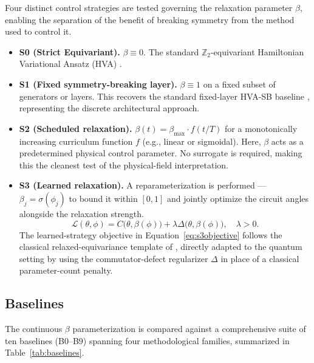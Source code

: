 \documentclass[10pt,twocolumn]{article}
\theoremstyle{remark}
\begin{document}
Four distinct control strategies are tested governing the relaxation parameter $\beta$, enabling the separation of the benefit of breaking symmetry from the method used to control it.
\begin{itemize}
    \item \textbf{S0 (Strict Equivariant).} $\beta \equiv 0$. The standard $\mathbb{Z}_2$-equivariant Hamiltonian Variational Ansatz (HVA) \cite{nguyen2024theory}.
    \item \textbf{S1 (Fixed symmetry-breaking layer).} $\beta \equiv 1$ on a fixed subset of generators or layers. This recovers the standard fixed-layer HVA-SB baseline \cite{park2021symmetry,park2024symmetry}, representing the discrete architectural approach.
    \item \textbf{S2 (Scheduled relaxation).} $\beta(t) = \beta_{\text{max}} \cdot f(t/T)$ for a monotonically increasing curriculum function $f$ (e.g., linear or sigmoidal). Here, $\beta$ acts as a predetermined physical control parameter. No surrogate is required, making this the cleanest test of the physical-field interpretation.
    \item \textbf{S3 (Learned relaxation).} A reparameterization is performed --- $\beta_j = \sigma(\phi_j)$ to bound it within $[0,1]$ and jointly optimize the circuit angles alongside the relaxation strength.
    \begin{equation}
    \mathcal{L}(\theta, \phi) = C\big(\theta, \beta(\phi)\big) + \lambda \Delta\big(\theta, \beta(\phi)\big), \quad \lambda > 0.
    \label{eq:s3objective}
    \end{equation}
    The learned-strategy objective in Equation~\eqref{eq:s3objective} follows the classical relaxed-equivariance template of \cite{vanderouderaa2022relaxed}, directly adapted to the quantum setting by using the commutator-defect regularizer $\Delta$ in place of a classical parameter-count penalty.
\end{itemize}

\subsection{Baselines}

The continuous $\beta$ parameterization is compared against a comprehensive suite of ten baselines (B0--B9) spanning four methodological families, summarized in Table~\ref{tab:baselines}.
\end{document}
